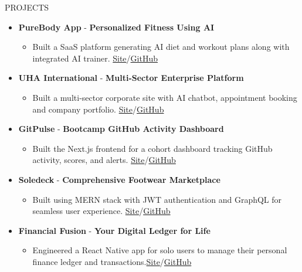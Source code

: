 \documentclass{resume}
\begin{document}
\begin{rSection}{PROJECTS}
\begin{itemize}
\item \textbf{PureBody App} - \textbf{Personalized Fitness Using AI}
\begin{itemize}
\itemsep -3pt {}
\item Built a SaaS platform generating AI diet and workout plans along with integrated AI trainer. \href{https://faisalhanif.work/sass-app.html}{Site}/\href{https://github.com/FaisalHanif12/PureBody}{GitHub}
\end{itemize}
\item \textbf{UHA International} - \textbf{Multi-Sector Enterprise Platform}
\begin{itemize}
\itemsep -3pt {}
\item Built a multi-sector corporate site with AI chatbot, appointment booking and company portfolio. \href{https://uha-international.com/}{Site}/\href{https://github.com/FaisalHanif12/UHA-International}{GitHub}
\end{itemize}
\item \textbf{GitPulse} - \textbf{Bootcamp GitHub Activity Dashboard}
\begin{itemize}
\itemsep -3pt {}
\item Built the Next.js frontend for a cohort dashboard tracking GitHub activity, scores, and alerts. \href{https://gitpulseee.netlify.app/}{Site}/\href{https://github.com/FaisalHanif12/GitPulse}{GitHub}
\end{itemize}
\item \textbf{Soledeck} - \textbf{Comprehensive Footwear Marketplace}
\begin{itemize}
\itemsep -3pt {}
\item Built using MERN stack with JWT authentication and GraphQL for seamless user experience. \href{https://soledeckf.vercel.app/}{Site}/\href{https://github.com/FaisalHanif12/Soledeck}{GitHub}
\end{itemize}
\item \textbf{Financial Fusion} - \textbf{Your Digital Ledger for Life}
\begin{itemize}
\itemsep -3pt {}
\item Engineered a React Native app for solo users to manage their personal finance ledger and transactions.\href{https://financial-fusion.netlify.app/}{Site}/\href{https://github.com/FaisalHanif12/Dosnexa}{GitHub}
\end{itemize}
\end{itemize}
\end{rSection}
\end{document}
